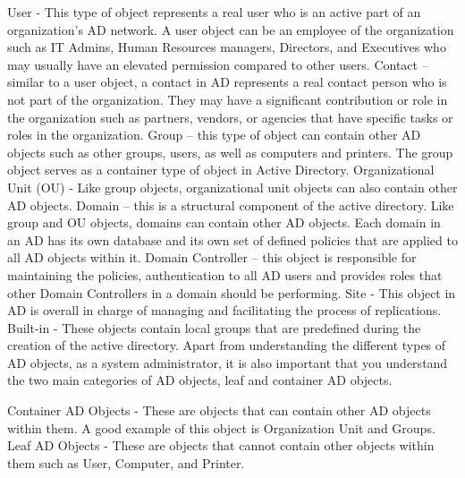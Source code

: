 User - This type of object represents a real user who is an active part of an organization’s AD network. A user object can be an employee of the organization such as IT Admins, Human Resources managers, Directors, and Executives who may usually have an elevated permission compared to other users.
Contact – similar to a user object, a contact in AD represents a real contact person who is not part of the organization. They may have a significant contribution or role in the organization such as partners, vendors, or agencies that have specific tasks or roles in the organization.
Group – this type of object can contain other AD objects such as other groups, users, as well as computers and printers. The group object serves as a container type of object in Active Directory.
Organizational Unit (OU) - Like group objects, organizational unit objects can also contain other AD objects.
Domain – this is a structural component of the active directory. Like group and OU objects, domains can contain other AD objects. Each domain in an AD has its own database and its own set of defined policies that are applied to all AD objects within it.
Domain Controller – this object is responsible for maintaining the policies, authentication to all AD users and provides roles that other Domain Controllers in a domain should be performing.
Site - This object in AD is overall in charge of managing and facilitating the process of replications.
Built-in - These objects contain local groups that are predefined during the creation of the active directory.
Apart from understanding the different types of AD objects, as a system administrator, it is also important that you understand the two main categories of AD objects, leaf and container AD objects.

Container AD Objects - These are objects that can contain other AD objects within them. A good example of this object is Organization Unit and Groups.
Leaf AD Objects - These are objects that cannot contain other objects within them such as User, Computer, and Printer.

